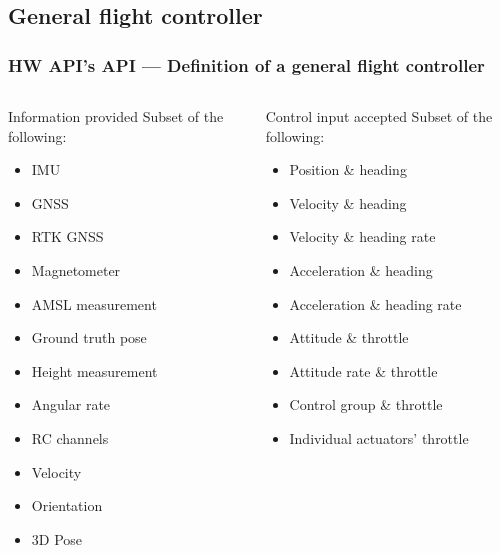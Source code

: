 \documentclass[aspectratio=169,9pt]{beamer}
\begin{document}


\subsection{General flight controller}

\begin{frame}
  \frametitle{HW API's API --- Definition of a general flight controller}

  \begin{columns}[c]

    \begin{block}{Information provided}
      Subset of the following:
      \begin{itemize}
        \item IMU
        \item GNSS
        \item RTK GNSS
        \item Magnetometer
        \item AMSL measurement
        \item Ground truth pose
        \item Height measurement
        \item Angular rate
        \item RC channels
        \item Velocity
        \item Orientation
        \item 3D Pose
      \end{itemize}
    \end{block}

    \begin{block}{Control input accepted}
      Subset of the following:
      \begin{itemize}
        \item Position \& heading
        \item Velocity \& heading
        \item Velocity \& heading rate
        \item Acceleration \& heading
        \item Acceleration \& heading rate
        \item Attitude \& throttle
        \item Attitude rate \& throttle
        \item Control group \& throttle
        \item Individual actuators' throttle
      \end{itemize}
    \end{block}

  \end{columns}

\end{frame}
\end{document}
